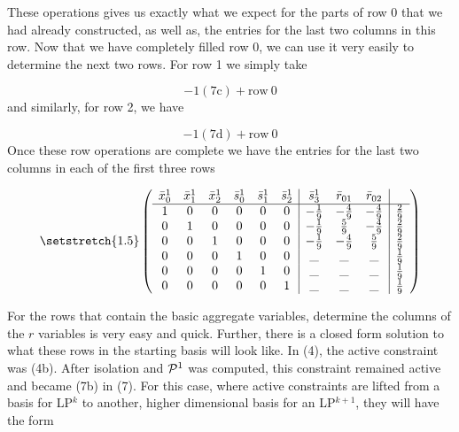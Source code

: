 \documentclass[11pt]{article} %
\newcommand{\cP}{{\cal P}}
\begin{document}
	These operations gives us exactly what we expect for the parts of row 0 that we had already constructed, as well as, the entries for the last two columns in this row.  Now that we have completely filled row 0, we can use it very easily to determine the next two rows.  For row 1 we simply take
	
	\begin{equation}
	-1(7\text{c}) + \text{row} \ 0
	\end{equation}
	and similarly, for row 2, we have
	
	\begin{equation}
	-1(7\text{d}) + \text{row} \ 0
	\end{equation}
	Once these row operations are complete we have the entries for the last two columns in each of the first three rows 
	
	\begin{equation}\setstretch{1.5}
	\begin{pmatrix}
	\begin{array}{cccccc|ccc|c}
		\bar{x}^1_0 & \bar{x}^1_1 & \bar{x}^1_2 & \bar{s}^1_0 & \bar{s}^1_1 & \bar{s}^1_2 & \bar{s}^1_3 & \bar{r}_{01} & \bar{r}_{02} \\
	\hline
	1 & 0 & 0 & 0 & 0 & 0 & -\frac{1}{9} & -\frac{4}{9} & -\frac{4}{9} & \frac{2}{9} \\ 
	0 & 1 & 0 & 0 & 0 & 0 & -\frac{1}{9} &  \frac{5}{9} & -\frac{4}{9} & \frac{2}{9} \\ 
	0 & 0 & 1 & 0 & 0 & 0 & -\frac{1}{9} & -\frac{4}{9} & \frac{5}{9} & \frac{2}{9} \\ 
	0 & 0 & 0 & 1 & 0 & 0 & \_ & \_ & \_ & \frac{1}{9} \\ 
	0 & 0 & 0 & 0 & 1 & 0 & \_ & \_ & \_ & \frac{1}{9} \\
	0 & 0 & 0 & 0 & 0 & 1 & \_ & \_ & \_ & \frac{1}{9} \\
	\end{array}
	\end{pmatrix}
	\end{equation}
	
	For the rows that contain the basic aggregate variables, determine the columns of the $r$ variables is very easy and quick.  Further, there is a closed form solution to what these rows in the starting basis will look like.  In (4), the active constraint was (4b).  After isolation and $\cP^1$ was computed, this constraint remained active and became (7b) in (7).  For this case, where active constraints are lifted from a basis for LP$^k$ to another, higher dimensional basis for an LP$^{k + 1}$, they will have the form 
	
\end{document}
